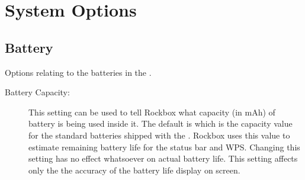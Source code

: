 \section{\label{ref:SystemOptions}System Options}

\subsection{Battery}
    Options relating to the batteries in the \dap.
  \begin{description}
    \item [Battery Capacity: ]This setting can be used to tell Rockbox what
      capacity (in mAh) of battery is being used inside it. The default is
      which is the capacity value for the standard batteries shipped with the \dap.
      Rockbox uses this value to estimate remaining battery life for the status
      bar and WPS. Changing this setting has no effect whatsoever on actual battery life.
      This setting affects only the the accuracy of the battery life display on screen.
   
    
    
  \end{description}

